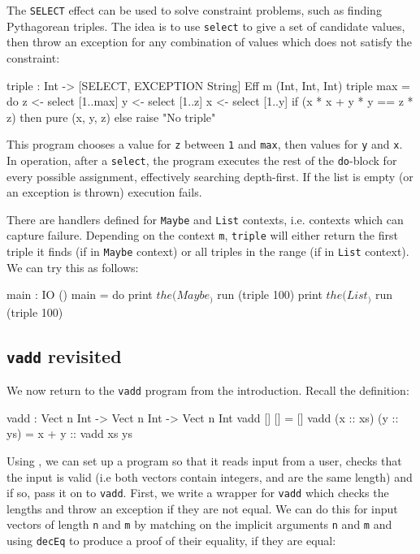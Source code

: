 The \texttt{SELECT} effect can be used to solve constraint problems, such as
finding Pythagorean triples. The idea is to use \texttt{select} to give a
set of candidate values, then throw an exception for any combination of values
which does not satisfy the constraint:

\begin{code}
triple : Int -> { [SELECT, EXCEPTION String] } Eff m (Int, Int, Int)
triple max = do z <- select [1..max]
                y <- select [1..z]
                x <- select [1..y]
                if (x * x + y * y == z * z)
                   then pure (x, y, z)
                   else raise "No triple"
\end{code}

\noindent
This program chooses a value for \texttt{z} between \texttt{1} and \texttt{max},
then values for \texttt{y} and \texttt{x}. In operation, after a
\texttt{select}, the program executes the rest of the \texttt{do}-block for
every possible assignment, effectively searching depth-first. If the list
is empty (or an exception is thrown) execution fails.

There are handlers defined for \texttt{Maybe} and \texttt{List} contexts,
i.e. contexts which can capture failure.
Depending on the context \texttt{m}, \texttt{triple} will either return the
first triple it finds (if in \texttt{Maybe} context) or all triples in the
range (if in \texttt{List} context). We can try this as follows:

\begin{code}
main : IO ()
main = do print $ the (Maybe _) $ run (triple 100)
          print $ the (List _) $ run (triple 100)
\end{code}

\subsection{\texttt{vadd} revisited}

We now return to the \texttt{vadd} program from the introduction. Recall the
definition:

\begin{code}
vadd : Vect n Int -> Vect n Int -> Vect n Int
vadd []        []        = []
vadd (x :: xs) (y :: ys) = x + y :: vadd xs ys
\end{code}

\noindent
Using \effects{}, we can set up a program so that it reads input from a user,
checks that the input is valid (i.e both vectors contain integers, and are
the same length) and if so, pass it on to \texttt{vadd}. First, we write
a wrapper for \texttt{vadd} which checks the lengths and throw an exception
if they are not equal. We can do this for input vectors of length \texttt{n}
and \texttt{m} by matching on the implicit arguments \texttt{n} and
\texttt{m} and using \texttt{decEq} to produce a proof of their equality,
if they are equal:

